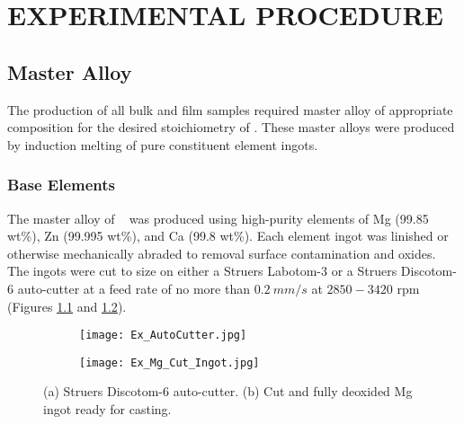 \documentclass[a4paper,12pt,oneside]{report}%
\begin{document}

\newpage
{}
\tableofcontents\newpage
\clearpage %


\chapter{EXPERIMENTAL PROCEDURE}

\section{Master Alloy}
The production of all bulk and film samples required master alloy of appropriate composition for the desired stoichiometry of \MgZnCa. These master alloys were produced by induction melting of pure constituent element ingots.

\subsection{Base Elements}
The master alloy of \MgZnCa~ was produced using high-purity elements of Mg (99.85 wt\%), Zn (99.995 wt\%), and Ca (99.8 wt\%). Each element ingot was linished or otherwise mechanically abraded to removal surface contamination and oxides. The ingots were cut to size on either a Struers Labotom-3 or a Struers Discotom-6 auto-cutter at a feed rate of no more than $0.2~ mm/s$ at $2850 - 3420$ \acrshort{rpm} (Figures \ref{fig:AutoCutter} and \ref{fig:MgIngot}).

\begin{figure}[htbp]
	\centering
	\begin{subfigure}[htbp]{0.49\textwidth}
		\texttt{[image: Ex\_AutoCutter.jpg]}
		\caption{}
		\label{fig:AutoCutter}
	\end{subfigure}
	\begin{subfigure}[htbp]{0.30\textwidth}
		\texttt{[image: Ex\_Mg\_Cut\_Ingot.jpg]}
		\caption{}
		\label{fig:MgIngot}
	\end{subfigure}
	\caption{(a) Struers Discotom-6 auto-cutter. (b) Cut and fully deoxided Mg ingot ready for casting.}%
	\label{fig:Cutter_MgIngot}
\end{figure}
\end{document}
